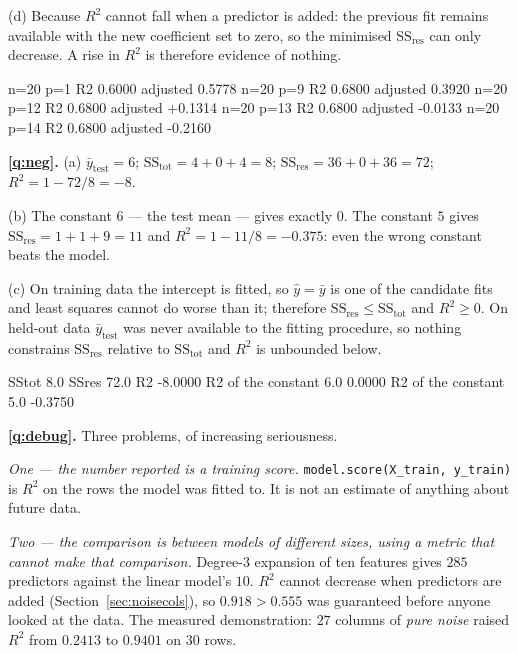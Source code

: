 \documentclass[11pt]{article}
\begin{document}
(d) Because $R^2$ cannot fall when a predictor is added: the previous fit
remains available with the new coefficient set to zero, so the minimised
$\mathrm{SS_{res}}$ can only decrease. A rise in $R^2$ is therefore evidence of
nothing.

\begin{codeout}
n=20 p=1  R2 0.6000  adjusted 0.5778
n=20 p=9  R2 0.6800  adjusted 0.3920
   n=20 p=12 R2 0.6800  adjusted +0.1314
   n=20 p=13 R2 0.6800  adjusted -0.0133
   n=20 p=14 R2 0.6800  adjusted -0.2160
\end{codeout}

\medskip
\textbf{\ref{q:neg}.} (a) $\bar y_{\mathrm{test}} = 6$;
$\mathrm{SS_{tot}} = 4 + 0 + 4 = 8$;
$\mathrm{SS_{res}} = 36 + 0 + 36 = 72$; $R^2 = 1 - 72/8 = -8$.

(b) The constant $6$ --- the test mean --- gives exactly $0$. The constant $5$
gives $\mathrm{SS_{res}} = 1 + 1 + 9 = 11$ and $R^2 = 1 - 11/8 = -0.375$: even
the wrong constant beats the model.

(c) On training data the intercept is fitted, so $\hat y = \bar y$ is one of
the candidate fits and least squares cannot do worse than it; therefore
$\mathrm{SS_{res}} \le \mathrm{SS_{tot}}$ and $R^2 \ge 0$. On held-out data
$\bar y_{\mathrm{test}}$ was never available to the fitting procedure, so
nothing constrains $\mathrm{SS_{res}}$ relative to $\mathrm{SS_{tot}}$ and
$R^2$ is unbounded below.

\begin{codeout}
SStot 8.0  SSres 72.0  R2 -8.0000
R2 of the constant 6.0  0.0000
R2 of the constant 5.0  -0.3750
\end{codeout}

\medskip
\textbf{\ref{q:debug}.} Three problems, of increasing seriousness.

\emph{One --- the number reported is a training score.}
\texttt{model.score(X\_train, y\_train)} is $R^2$ on the rows the model was
fitted to. It is not an estimate of anything about future data.

\emph{Two --- the comparison is between models of different sizes, using a
metric that cannot make that comparison.} Degree-3 expansion of ten features
gives $285$ predictors against the linear model's $10$. $R^2$ cannot decrease
when predictors are added (Section~\ref{sec:noisecols}), so
$0.918 > 0.555$ was guaranteed before anyone looked at the data. The measured
demonstration: $27$ columns of \emph{pure noise} raised $R^2$ from $0.2413$ to
$0.9401$ on $30$ rows.
\end{document}
